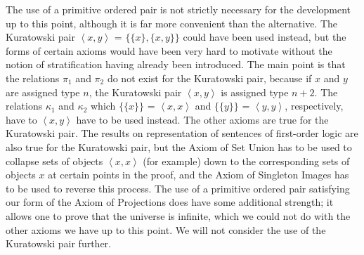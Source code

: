 The use of a primitive ordered pair is not strictly necessary for the
development up to this point, although it is far more convenient than
the alternative.  The Kuratowski pair
$\left<x,y\right>$ = $\{\{x\},\{x,y\}\}$ could have been used instead, but the
forms of certain axioms would have been very hard to motivate without the
notion of stratification having already been introduced.  The main
point is that the relations $\pi_1$ and $\pi_2$ do not exist for the
Kuratowski pair, because if $x$ and $y$ are assigned type $n$, the Kuratowski pair $\left<x,y\right>$ is assigned type $n+2$.
The relations $\kappa_1$ and $\kappa_2$ which $\{\{x\}\}$ =
$\left<x,x\right>$ and $\{\{y\}\}$ = $\left<y,y\right>$, respectively,
have to $\left<x,y\right>$ have to be used instead.  The other axioms
are true for the Kuratowski pair.  The results
on representation of
sentences of first-order logic are also true for the Kuratowski pair,
but the Axiom of Set Union has to be used to collapse sets of
objects $\left<x,x\right>$ (for example) down to the corresponding sets of
objects $x$ at certain points in the proof, and the Axiom of
Singleton
Images has to be used to reverse this process.  The use of a primitive
ordered pair satisfying our form of the Axiom of
Projections does
have some additional strength; it allows one to prove that the universe is
infinite, which we could not do with the other axioms we have up to
this point.  We will not consider the use of the Kuratowski pair further.
